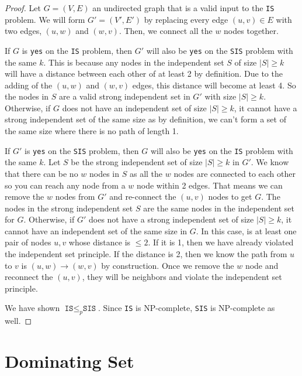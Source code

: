\documentclass{article}
\begin{document}
\begin{proof}
    Let $G = (V, E)$ an undirected graph that is a valid input to the \texttt{IS} problem.
    We will form $G' = (V', E')$ by replacing every edge $(u, v) \in E$ with two edges, $(u, w)$ and $(w, v)$.
    Then, we connect all the $w$ nodes together.

    If $G$ is \texttt{yes} on the \texttt{IS} problem, then $G'$ will also be \texttt{yes} on the \texttt{SIS} problem with the same $k$.
    This is because any nodes in the independent set $S$ of size $|S| \geq k$ will have a distance between each other of at least 2 by definition. 
    Due to the adding of the $(u, w)$ and $(w, v)$ edges, this distance will become at least 4. So the nodes in $S$ are a valid strong independent set in $G'$ with size $|S| \geq k$.
    Otherwise, if $G$ does not have an independent set of size $|S| \geq k$, it cannot have a strong independent set of the same size as by definition, we can't form a set of the same size where there is no path of length 1.

    If $G'$ is \texttt{yes} on the \texttt{SIS} problem, then $G$ will also be \texttt{yes} on the \texttt{IS} problem with the same $k$.
    Let $S$ be the strong independent set of size $|S| \geq k$ in $G'$. 
    We know that there can be no $w$ nodes in $S$ as all the $w$ nodes are connected to each other so you can reach any node from a $w$ node within 2 edges.
    That means we can remove the $w$ nodes from $G'$ and re-connect the $(u, v)$ nodes to get $G$. The nodes in the strong independent set $S$ are the same nodes in the independent set for $G$.
    Otherwise, if $G'$ does not have a strong independent set of size $|S| \geq k$, it cannot have an independent set of the same size in $G$.
    In this case, is at least one pair of nodes $u, v$ whose distance is $\leq 2$. If it is 1, then we have already violated the independent set principle.
    If the distance is 2, then we know the path from $u$ to $v$ is $(u, w) \rightarrow (w, v)$ by construction. Once we remove the $w$ node and reconnect the $(u, v)$, they will be neighbors and violate the independent set principle.

    We have shown $\texttt{IS} \leq_p \texttt{SIS}$. Since \texttt{IS} is NP-complete, \texttt{SIS} is NP-complete as well.
\end{proof}


\newpage
\section{Dominating Set}
\end{document}

